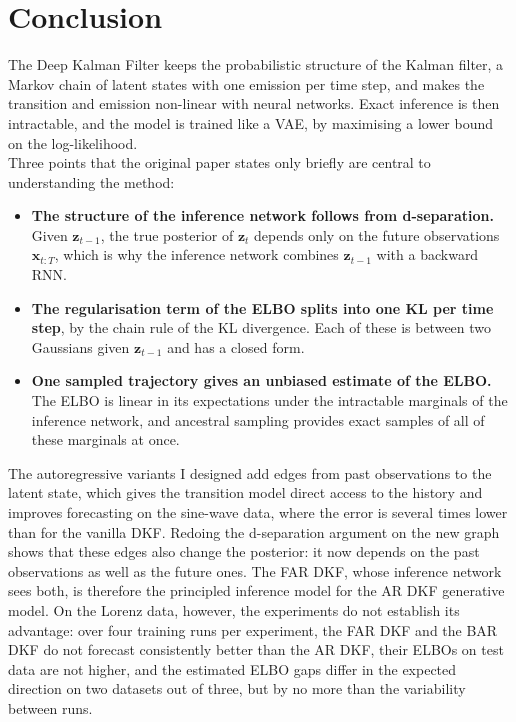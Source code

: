 \chapter{Conclusion}

The Deep Kalman Filter keeps the probabilistic structure of the Kalman
filter, a Markov chain of latent states with one emission per time step,
and makes the transition and emission non-linear with neural networks.
Exact inference is then intractable, and the model is trained like a VAE,
by maximising a lower bound on the log-likelihood.\\

Three points that the original paper states only briefly are central to
understanding the method:
\begin{itemize}
    \item \textbf{The structure of the inference network follows from
    d-separation.} Given $\mathbf{z}_{t-1}$, the true posterior of
    $\mathbf{z}_t$ depends only on the future observations
    $\mathbf{x}_{t:T}$, which is why the inference network combines
    $\mathbf{z}_{t-1}$ with a backward RNN.
    \item \textbf{The regularisation term of the ELBO splits into one KL
    per time step}, by the chain rule of the KL divergence. Each of these is between two
    Gaussians given $\mathbf{z}_{t-1}$ and has a closed form.
    \item \textbf{One sampled trajectory gives an unbiased estimate of
    the ELBO.} The ELBO is linear in its expectations under the
    intractable marginals of the inference network, and ancestral
    sampling provides exact samples of all of these marginals at once.
\end{itemize}

The autoregressive variants I designed add edges from past observations
to the latent state, which gives the transition model direct access to
the history and improves forecasting on the sine-wave data, where the
error is several times lower than for the vanilla DKF.
Redoing the d-separation argument on the new graph shows that these
edges also change the posterior: it now depends on the past observations
as well as the future ones. The FAR DKF, whose inference network sees
both, is therefore the principled inference model for the AR DKF
generative model. On the Lorenz data, however, the experiments do not
establish its advantage: over four training runs per experiment, the
FAR DKF and the BAR DKF do not forecast consistently better than the AR
DKF, their ELBOs on test data are not higher, and the estimated ELBO
gaps differ in the expected direction on two datasets out of three, but
by no more than the variability between runs.\\

